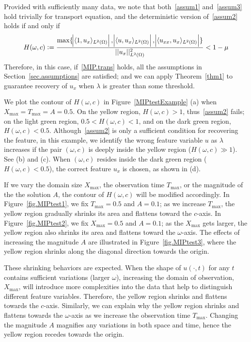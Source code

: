 \documentclass[a4paper,11pt]{article}
\begin{document}
Provided with sufficiently many data, we note that both~\eqref{assum1} and~\eqref{assum3} hold trivially for transport equation, and the deterministic version of~\eqref{assum2}  holds if and only if
\begin{align}
H(\omega,c):=\frac{\max\{\abs{\langle 1,u_x\rangle_{L^2(\Omega)}},\abs{\langle u,u_x\rangle_{L^2(\Omega)}},\abs{\langle u_{xx},u_x\rangle_{L^2(\Omega)}}\}}{||u_x||^2_{L^2(\Omega)}}<1-\mu	\label{MIP.trans}
\end{align}
Therefore,  in this case, if~\eqref{MIP.trans} holds, all the assumptions in Section~\ref{sec.assumptions} are satisfied; and we can apply Theorem~\ref{thm1} to guarantee recovery of $u_x$ when $\lambda$ is greater than some threshold.

We plot the contour of $H(\omega,c)$ in Figure~\ref{MIPtestExample} (a) when $X_{\max}=T_{\max}=A=0.5$. On the yellow region, $H(\omega,c)>1$, thus~\eqref{assum2} fails; on the light green region,  $0.5<H(\omega,c)<1$, and on the dark green region, $H(\omega,c)<0.5$.  Although~\eqref{assum2} is only a sufficient condition for recovering the feature, in this example, we identify the wrong feature variable $u$ as $\lambda$ increases if the pair $(\omega,c)$ is deeply inside the yellow region ($H(\omega,c)\gg 1$). See (b) and (c). When $(\omega,c)$ resides inside the dark green region ($H(\omega,c)<0.5$), the correct feature $u_x$ is chosen, as shown in (d).


If we vary the domain size $X_{\max}$, the observation time $T_{\max}$, or the magnitude of the the solution $A$, the contour of $H(\omega,c)$ will be modified accordingly. In Figure~\ref{fig.MIPtest1}, we fix $T_{\max}=0.5$ and $A=0.1$; as we increase $T_{\max}$, the yellow region gradually shrinks its area and flattens toward the $c$-axis. In Figure~\ref{fig.MIPtest2}, we fix $X_{\max}=0.5$ and $A=0.1$; as the $X_{\max}$ gets larger, the yellow region also shrinks its area and flattens toward the $\omega$-axis. The effects of increasing the magnitude $A$ are illustrated in Figure~\ref{fig.MIPtest3}, where the yellow region shrinks along the diagonal direction towards the origin.

These shrinking behaviors are expected. When the shape of $u(\cdot,t)$ for any $t$ contains sufficient variations (larger $\omega$), increasing the domain of observation, $X_{\max}$, will introduce more complexities into the data that help to distinguish different feature variables. Therefore, the yellow region shrinks and flattens towards the $c$-axis. Similarly, we can explain why the yellow region shrinks and flattens towards the $\omega$-axis as we increase the observation time $T_{\max}$. Changing the magnitude $A$ magnifies any variations in both space and time, hence the yellow region recedes towards the origin.
\end{document}
